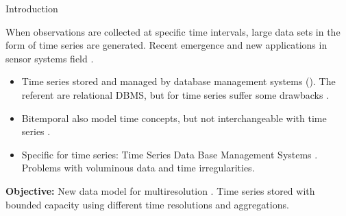 
\begin{frame}{Introduction}

  When observations are collected at specific time intervals, large
  data sets in the form of time series are generated. Recent emergence
  and new applications in sensor systems field \parencite{bonnet01}.

  \begin{itemize}

  \item Time series stored and managed by database management systems
    (). The referent are relational DBMS, but for time
    series suffer some
    drawbacks \parencite{dreyer94,schmidt95,stonebraker09:scidb,zhang11}.

  \item Bitemporal  also model time concepts, but not
    interchangeable with time
    series \parencite{schmidt95,date02:_tempor_data_relat_model}.

  \item Specific  for time series: Time Series Data Base
    Management Systems \parencite{dreyer94}. Problems with voluminous
    data and time irregularities.

  \end{itemize}

  \textbf{Objective:} New data model for multiresolution .
  Time series stored with bounded capacity using different time resolutions
  and aggregations.

\end{frame}







